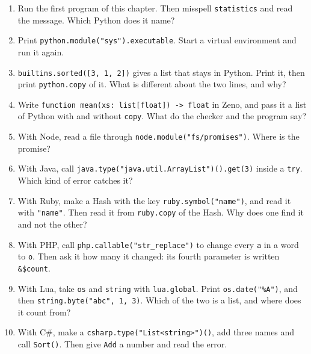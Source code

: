 \begin{enumerate}
\item Run the first program of this chapter. Then misspell
  \verb|statistics| and read the message. Which Python does it name?
\item Print \verb|python.module("sys").executable|. Start a virtual
  environment and run it again.
\item \verb|builtins.sorted([3, 1, 2])| gives a list that stays in
  Python. Print it, then print \verb|python.copy| of it. What is
  different about the two lines, and why?
\item Write \verb|function mean(xs: list[float]) -> float| in Zeno, and pass
  it a list of Python with and without \verb|copy|. What do the
  checker and the program say?
\item With Node, read a file through \verb|node.module("fs/promises")|.
  Where is the promise?
\item With Java, call \verb|java.type("java.util.ArrayList")().get(3)|
  inside a \verb|try|. Which kind of error catches it?
\item With Ruby, make a Hash with the key \verb|ruby.symbol("name")|,
  and read it with \verb|"name"|. Then read it from \verb|ruby.copy| of
  the Hash. Why does one find it and not the other?
\item With PHP, call \verb|php.callable("str_replace")| to change every
  \verb|a| in a word to \verb|o|. Then ask it how many it changed: its
  fourth parameter is written \verb|&$count|.
\item With Lua, take \verb|os| and \verb|string| with
  \verb|lua.global|. Print \verb|os.date("%A")|, and then
  \verb|string.byte("abc", 1, 3)|. Which of the two is a list, and
  where does it count from?
\item With C\#, make a \verb|csharp.type("List<string>")()|, add three
  names and call \verb|Sort()|. Then give \verb|Add| a number and read
  the error.
\end{enumerate}
